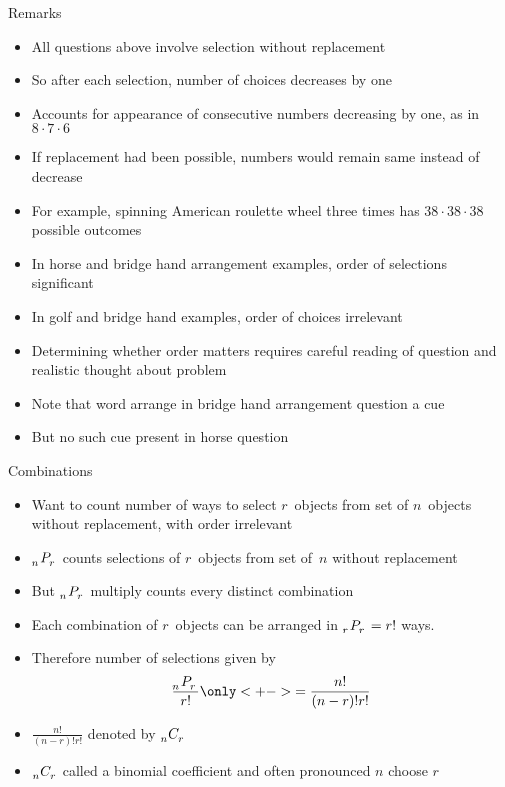 \documentclass[handout]{beamer}
\theoremstyle{definition}
\newcommand\npr[2]{\tensor[_{#1}]P{_{#2}}}
\newcommand\ncr[2]{\tensor[_{#1}]C{_{#2}}}
\begin{document}
\begin{frame}{Remarks}
\begin{itemize}
\item All questions above involve selection \alert{without replacement}
\item So after each selection, number of choices decreases by one
\item Accounts for appearance of consecutive numbers decreasing
by one, as in $8\cdot 7\cdot 6$
\item If replacement had been possible, numbers would remain same
instead of decrease
\item For example, spinning American roulette wheel three times
has $38\cdot 38\cdot 38$ possible outcomes
\end{itemize}
\end{frame}
\begin{frame}
\begin{itemize}
\item In horse and bridge hand arrangement examples, order of selections
significant
\item In golf and bridge hand examples, order of choices irrelevant
\item Determining whether order matters requires careful reading of question
and realistic thought about problem
\item Note that word \alert{arrange} in bridge hand arrangement
question a \alert{cue}
\item But no such cue present in horse question
\end{itemize}
\end{frame}

\begin{frame}{Combinations}
\begin{itemize}
\item Want to count number
of ways to select $r$~objects from set of $n$~objects
without replacement, \alert{with order irrelevant}
\item $\npr{n}{r}$
counts selections of $r$~objects from set of~$n$
without replacement
\item But $\npr{n}{r}$ multiply counts
every distinct \alert{combination}
\item Each combination of $r$~objects can be arranged
in $\npr{r}{r}=r!$ ways.
\item Therefore number of selections
given by \[\frac{\npr{n}{r}}{r!}
\only<+->{=\frac{n!}{\left(n-r\right)!r!}}\]
\item
$\frac{n!}{\left(n-r\right)!r!}$ denoted by $\ncr{n}{r}$
\item $\ncr{n}{r}$ called a \alert{binomial coefficient}
and often pronounced \alert{$n$ choose $r$}
\end{itemize}
\end{frame}
\end{document}
